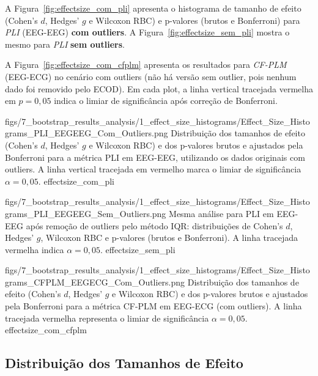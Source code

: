 A Figura~\ref{fig:effectsize_com_pli} apresenta o histograma de tamanho de efeito (Cohen's \(d\), Hedges' \(g\) e Wilcoxon RBC) e p-valores (brutos e Bonferroni) para \emph{PLI} (EEG-EEG) \textbf{com outliers}. A Figura~\ref{fig:effectsize_sem_pli} mostra o mesmo para \emph{PLI} \textbf{sem outliers}.

A Figura~\ref{fig:effectsize_com_cfplm} apresenta os resultados para \emph{CF-PLM} (EEG-ECG) no cenário com outliers (não há versão sem outlier, pois nenhum dado foi removido pelo ECOD). Em cada plot, a linha vertical tracejada vermelha em \(p=0{,}05\) indica o limiar de significância após correção de Bonferroni.

\clearpage
\ultrawidefigure
{figs/7_bootstrap_results_analysis/1_effect_size_histograms/Effect_Size_Histograms_PLI_EEGEEG_Com_Outliers.png}
{Distribuição dos tamanhos de efeito (Cohen's \(d\), Hedges' \(g\) e Wilcoxon RBC) e dos p-valores brutos e ajustados pela Bonferroni para a métrica PLI em EEG-EEG, utilizando os dados originais com outliers. A linha vertical tracejada em vermelho marca o limiar de significância \(\alpha=0{,}05\).}
{effectsize_com_pli}

\ultrawidefigure
{figs/7_bootstrap_results_analysis/1_effect_size_histograms/Effect_Size_Histograms_PLI_EEGEEG_Sem_Outliers.png}
{Mesma análise para PLI em EEG-EEG após remoção de outliers pelo método IQR: distribuições de Cohen's \(d\), Hedges' \(g\), Wilcoxon RBC e p-valores (brutos e Bonferroni). A linha tracejada vermelha indica \(\alpha=0{,}05\).}
{effectsize_sem_pli}

\ultrawidefigure
{figs/7_bootstrap_results_analysis/1_effect_size_histograms/Effect_Size_Histograms_CFPLM_EEGECG_Com_Outliers.png}
{Distribuição dos tamanhos de efeito (Cohen's \(d\), Hedges' \(g\) e Wilcoxon RBC) e dos p-valores brutos e ajustados pela Bonferroni para a métrica CF-PLM em EEG-ECG (com outliers). A linha tracejada vermelha representa o limiar de significância \(\alpha=0{,}05\).}
{effectsize_com_cfplm}

\clearpage
\subsection{Distribuição dos Tamanhos de Efeito}
